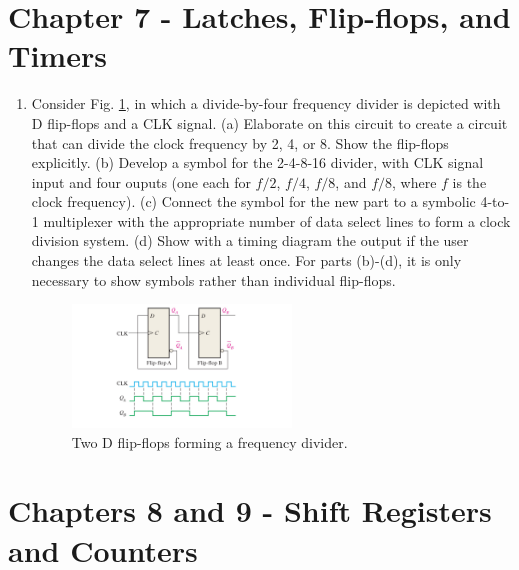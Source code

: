 \documentclass[10pt]{article}
\begin{document}
\section{Chapter 7 - Latches, Flip-flops, and Timers}
\label{sec:latch}
\begin{enumerate}
\item Consider Fig. \ref{fig:twoDFF}, in which a divide-by-four frequency divider is depicted with D flip-flops and a CLK signal. (a) Elaborate on this circuit to create a circuit that can divide the clock frequency by 2, 4, or 8. Show the flip-flops explicitly.  (b) Develop a symbol for the 2-4-8-16 divider, with CLK signal input and four ouputs (one each for $f/2$, $f/4$, $f/8$, and $f/8$, where $f$ is the clock frequency). (c) Connect the symbol for the new part to a symbolic 4-to-1 multiplexer with the appropriate number of data select lines to form a clock division system.  (d) Show with a timing diagram the output if the user changes the data select lines at least once.  For parts (b)-(d), it is only necessary to show symbols rather than individual flip-flops.
\begin{figure}[ht]
\centering
\includegraphics[width=0.55\textwidth]{figures/twoDFF.pdf}
\caption{\label{fig:twoDFF} Two D flip-flops forming a frequency divider.}
\end{figure}
\end{enumerate}

\clearpage

\section{Chapters 8 and 9 - Shift Registers and Counters}
\end{document}
